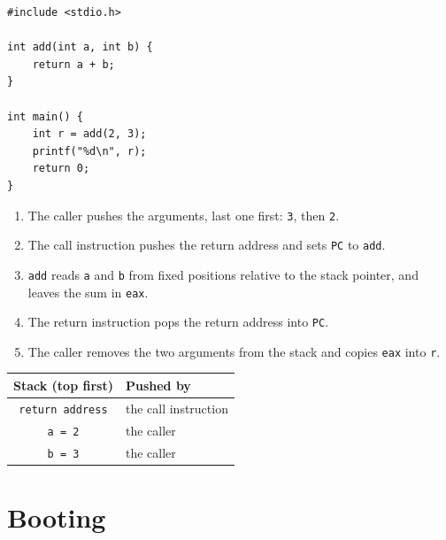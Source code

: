 \documentclass{article}
\newcommand{\reg}[1]{\texttt{#1}}
\begin{document}
\begin{verbatim}
#include <stdio.h>

int add(int a, int b) {
	return a + b;
}

int main() {
	int r = add(2, 3);
	printf("%d\n", r);
	return 0;
}
\end{verbatim}

\begin{enumerate}
	\item The caller pushes the arguments, last one first: \texttt{3}, then \texttt{2}.
	\item The call instruction pushes the return address and sets \reg{PC} to \texttt{add}.
	\item \texttt{add} reads \texttt{a} and \texttt{b} from fixed positions relative to the stack pointer, and leaves the sum in \texttt{eax}.
	\item The return instruction pops the return address into \reg{PC}.
	\item The caller removes the two arguments from the stack and copies \texttt{eax} into \texttt{r}.
\end{enumerate}

\begin{table}[H]
	\centering
	\begin{tabular}{cl}
		\toprule
		\textbf{Stack (top first)} & \textbf{Pushed by} \\
		\midrule
		\texttt{return address} & the call instruction \\
		\texttt{a = 2} & the caller \\
		\texttt{b = 3} & the caller \\
		\bottomrule
	\end{tabular}
\end{table}

\section{Booting}
\end{document}
